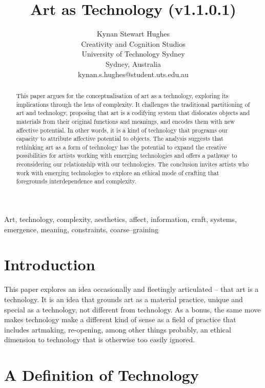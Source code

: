 \documentclass[letter:wpaper]{article}
\title{Art as Technology (v1.1.0.1)}
\author{Kynan Stewart Hughes\\
Creativity and Cognition Studios\\
University of Technology Sydney\\
Sydney, Australia\\
kynan.s.hughes@student.uts.edu.au\\
\newline
\newline
}
\begin{document}
 
\maketitle
\begin{abstract}

    This paper argues for the conceptualisation of art as a technology, exploring its implications through the lens of complexity. It challenges the traditional partitioning of art and technology, proposing that art is a codifying system that dislocates objects and materials from their original functions and meanings, and encodes them with new affective potential. In other words, it is a kind of technology that programs our capacity to attribute affective potential to objects. The analysis suggests that rethinking art as a form of technology has the potential to expand the creative possibilities for artists working with emerging technologies and offers a pathway to reconsidering our relationship with our technologies. The conclusion invites artists who work with emerging technologies to explore an ethical mode of crafting that foregrounds interdependence and complexity.

\end{abstract}


Art, technology, complexity, aesthetics, affect, information, craft, systems, emergence, meaning, constraints, coarse–graining

\section{Introduction}

    This paper explores an idea occasionally \citep[pp.74–75]{SauvagnarguesArtmchns2016} \citep{GellThTchnlgyOfEnchntmnt1992} and fleetingly \citep[p.202]{ZepkeOSullivanDlzCntmprryArt2010} articulated – that art is a technology. It is an idea that grounds art as a material practice, unique and special as a technology, not different from technology. As a bonus, the same move makes technology make a different kind of sense as a field of practice that includes artmaking, re-opening, among other things probably, an ethical dimension to technology that is otherwise too easily ignored. 
    
\section{A Definition of Technology} 
\end{document}
